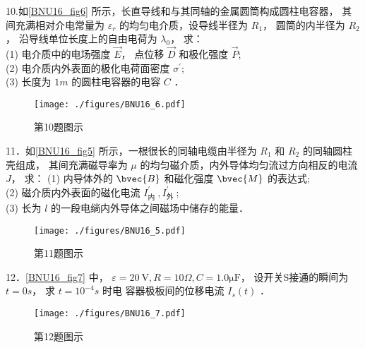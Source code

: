 10.如\autoref{BNU16_fig6} 所示，长直导线和与其同轴的金属圆筒构成圆柱电容器， 其间充满相对介电常量为 $\varepsilon_{r}$ 的均匀电介质，设导线半径为 $R_{1}$， 圆筒的内半径为 $R_{2}$， 沿导线单位长度上的自由电荷为 $\lambda_{0}$， 求：\\
(1) 电介质中的电场强度 $\vec{E}$， 点位移 $\vec{D}$ 和极化强度 $\vec{P}$;\\
(2) 电介质内外表面的极化电荷面密度 $\sigma^{\prime}$;\\
(3) 长度为 $1 m$ 的圆柱电容器的电容 $C$ ．
\begin{figure}[ht]
\centering
\texttt{[image: ./figures/BNU16\_6.pdf]}
\caption{第10题图示} \label{BNU16_fig6}
\end{figure}

11．如\autoref{BNU16_fig5} 所示，一根很长的同轴电缆由半径为 $R_{1}$ 和 $R_{2}$ 的同轴圆柱壳组成， 其间充满磁导率为 $\mu$ 的均匀磁介质，内外导体均匀流过方向相反的电流 $J$， 求：
(1) 内导体外的 $\bvec{B}$ 和磁化强度 $\bvec{M}$ 的表达式;\\
(2) 磁介质内外表面的磁化电流 $I_{\text {内 }}^{\prime}, I_{\text {外 }}^{\prime}$;\\
(3) 长为 $l$ 的一段电绱内外导体之间磁场中储存的能量．
\begin{figure}[ht]
\centering
\texttt{[image: ./figures/BNU16\_5.pdf]}
\caption{第11题图示} \label{BNU16_fig5}
\end{figure}
12．\autoref{BNU16_fig7} 中， $\varepsilon=20 \mathrm{~V}, R=10 \Omega, C=1.0\mathrm{\mu F}$， 设开关S接通的瞬间为 $t=0 s$， 求 $t=10^{-4} s$ 时电 容器极板间的位移电流 $I_{s}(t)$ ．
\begin{figure}[ht]
\centering
\texttt{[image: ./figures/BNU16\_7.pdf]}
\caption{第12题图示} \label{BNU16_fig7}
\end{figure}